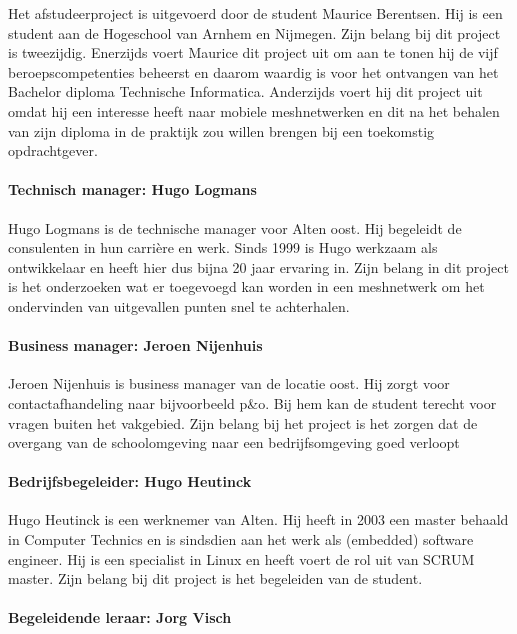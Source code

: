\documentclass[a4paper, 11pt, oneside]{report}
\begin{document}
Het afstudeerproject is uitgevoerd door de student Maurice Berentsen. 
Hij is een student aan de Hogeschool van Arnhem en Nijmegen. 
Zijn belang bij dit project is tweezijdig. 
Enerzijds voert Maurice dit project uit om aan te tonen hij de vijf beroepscompetenties beheerst en daarom waardig is voor het ontvangen van het Bachelor diploma Technische Informatica. 
Anderzijds voert hij dit project uit omdat hij een interesse heeft naar mobiele meshnetwerken en dit na het behalen van zijn diploma in de praktijk zou willen brengen bij een toekomstig opdrachtgever. 

\paragraph{Technisch manager: Hugo Logmans}

Hugo Logmans is de technische manager voor Alten oost. Hij begeleidt de consulenten in hun carrière en werk. Sinds 1999 is Hugo werkzaam als ontwikkelaar en heeft hier dus bijna 20 jaar ervaring in. Zijn belang in dit project is het onderzoeken wat er toegevoegd kan worden in een meshnetwerk om het ondervinden van uitgevallen punten snel te achterhalen.

\paragraph{Business manager: Jeroen Nijenhuis}
Jeroen Nijenhuis is business manager van de locatie oost. Hij zorgt voor contactafhandeling naar bijvoorbeeld p\&o. Bij hem kan de student terecht voor vragen buiten het vakgebied. Zijn belang bij het project is het zorgen dat de overgang van de schoolomgeving naar een bedrijfsomgeving goed verloopt 

\paragraph{Bedrijfsbegeleider: Hugo Heutinck}

Hugo Heutinck is een werknemer van Alten. Hij heeft in 2003 een master behaald in Computer Technics en is sindsdien aan het werk als (embedded) software engineer. Hij is een specialist in Linux en heeft voert de rol uit van SCRUM master. Zijn belang bij dit project is het begeleiden van de student.

\paragraph{Begeleidende leraar: Jorg Visch}
 
\end{document}
